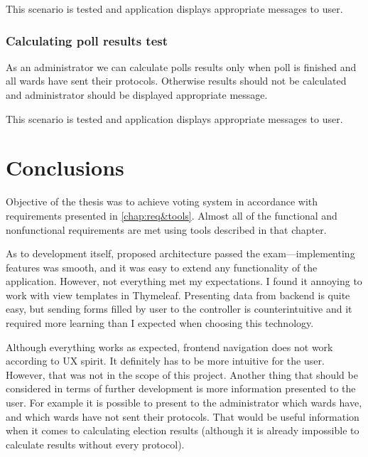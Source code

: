 \documentclass[a4paper,twoside,12pt]{book}
\newcounter{PagesWithoutNumbers}
\begin{document}
      This scenario is tested and application displays appropriate messages to user.

    \subsection{Calculating poll results test}
      As an administrator we can calculate polls results only when poll is finished and all wards have sent their protocols.
      Otherwise results should not be calculated and administrator should be displayed appropriate message.
      
      This scenario is tested and application displays appropriate messages to user.

\chapter{Conclusions}
  Objective of the thesis was to achieve voting system in accordance with requirements presented in \autoref{chap:req&tools}.
  Almost all of the functional and nonfunctional requirements are met using tools described in that chapter.%

  As to development itself, proposed architecture passed the exam---implementing features was smooth, and it was easy to extend any functionality of the application.
  However, not everything met my expectations. I found it annoying to work with view templates in Thymeleaf. 
  Presenting data from backend is quite easy, but sending forms filled by user to the controller is counterintuitive and it required more learning than I expected when choosing this technology.

  Although everything works as expected, frontend navigation does not work according to UX spirit.
  It definitely has to be more intuitive for the user. However, that was not in the scope of this project.
  Another thing that should be considered in terms of further development is more information presented to the user.
  For example it is possible to present to the administrator which wards have, and which wards have not sent their protocols.
  That would be useful information when it comes to calculating election results (although it is already impossible to calculate results without every protocol).  

\backmatter
{}
\setcounter{page}{\value{PagesWithoutNumbers}}
\end{document}
